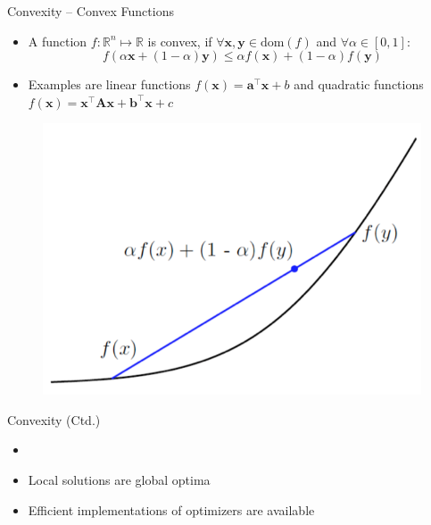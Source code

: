 \begin{frame}{Convexity -- Convex Functions}{}
	\begin{itemize}
		\item A function $f : \mathbb{R}^n \mapsto \mathbb{R}$ is convex, if $\forall \bm{x}, \bm{y} \in \text{dom}(f)$ and $\forall \alpha \in [0,1]$:
		\begin{equation}
			f(\alpha \bm{x} + (1 - \alpha) \bm{y}) \le \alpha f(\bm{x}) + (1 - \alpha) f(\bm{y})
		\end{equation}
		\item Examples are linear functions $f(\bm{x}) = \bm{a}^{\intercal} \bm{x} + b$
			and quadratic functions $f(\bm{x}) = \bm{x}^{\intercal} \bm{A} \bm{x} + \bm{b}^{\intercal} \bm{x} + c$
	\end{itemize}

	\vspace*{-3mm}
	\begin{figure}
		\center
		\includegraphics[scale=0.2]{02_math/02_img/convex_function}
	\end{figure}
\end{frame}


\begin{frame}{Convexity (Ctd.)}{}
	\begin{itemize}
		\item {}
		\item Local solutions are global optima
		\item Efficient implementations of optimizers are available
	\end{itemize}
\end{frame}


